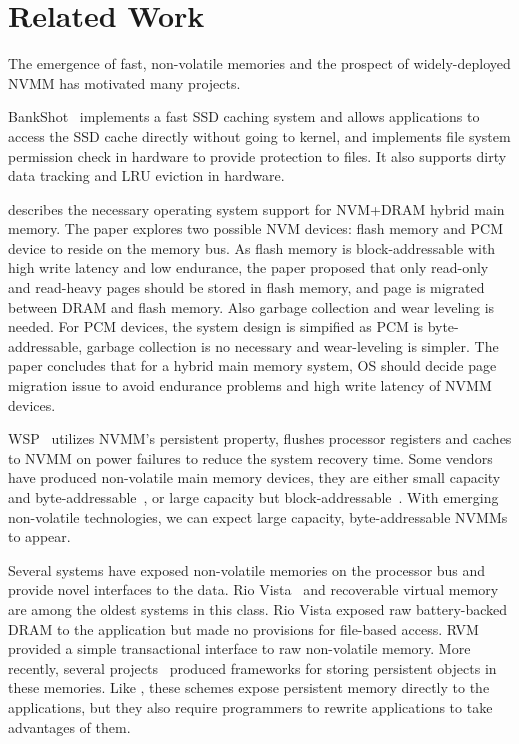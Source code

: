 \section{Related Work} 
\label{sec:related}

The emergence of fast, non-volatile memories and the prospect of
widely-deployed NVMM has motivated many projects.

BankShot~\cite{BankShot} implements a fast SSD caching system
and allows applications to access the SSD cache directly without going to
kernel, and implements file system permission check in hardware to provide
protection to files. It also supports dirty data tracking and LRU eviction
in hardware.

\cite{Mogul} describes the necessary operating system support for
NVM+DRAM hybrid main memory. The paper explores two possible NVM devices:
flash memory and PCM device to reside on the memory bus. As flash memory
is block-addressable with high write latency and low endurance, the paper
proposed that only read-only and read-heavy pages should be stored in flash
memory, and page is migrated between DRAM and flash memory. Also garbage
collection and wear leveling is needed. For PCM devices, the system design
is simpified as PCM is byte-addressable, garbage collection is no necessary
and wear-leveling is simpler. The paper concludes that for a hybrid main
memory system, OS should decide page migration issue to avoid endurance
problems and high write latency of NVMM devices.

WSP~\cite{WSP} utilizes NVMM's persistent property, flushes processor registers
and caches to NVMM on power failures to reduce the system recovery time.
Some vendors have produced non-volatile main memory devices, they are
either small capacity and byte-addressable~\cite{micron-nvdimm},
or large capacity but block-addressable~\cite{smart-system}.
With emerging non-volatile technologies, we can expect
large capacity, byte-addressable NVMMs to appear.

Several systems have exposed non-volatile memories on the processor bus
and provide novel interfaces to the data. Rio Vista~\cite{riovista} and
recoverable virtual memory~\cite{RVM} are among the oldest systems in this
class. Rio Vista exposed raw battery-backed DRAM to the application but made
no provisions for file-based access. RVM provided a simple transactional
interface to raw non-volatile memory.  More recently,
several projects~\cite{nvtm,
mnemosyne,hpnvdata} produced frameworks for storing persistent objects
in these memories.
Like \Chell{}, these schemes expose persistent memory directly
to the applications, but they also require programmers to rewrite applications
to take advantages of them.

